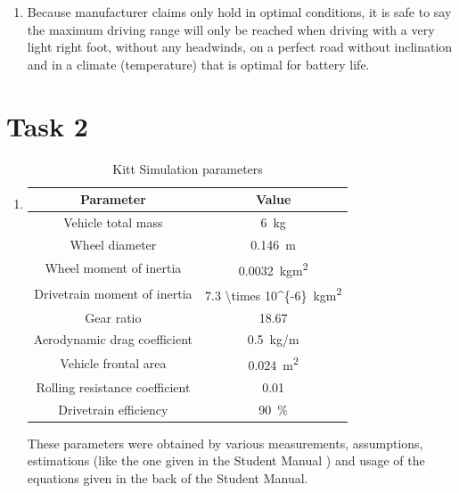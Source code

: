 \documentclass[11pt,titlepage]{report}
\begin{document}
\begin{enumerate}
\item
	Because manufacturer claims only hold in optimal conditions, it is safe to say the maximum driving range will only be reached when driving with a very light right foot, without any headwinds, on a perfect road without inclination and in a climate (temperature) that is optimal for battery life.
\end{enumerate}

\section{Task 2}
\begin{enumerate}
\item
	\begin{table}[H]
		\centering
		\caption{Kitt Simulation parameters}
		\label{tab:ass4-sim-param}
		\begin{tabular}{c c}
			\hline\hline
			Parameter & Value \\
			\hline
			Vehicle total mass & \SI{6}{kg} \\
			Wheel diameter & \SI{0.146}{m} \cite{traxxas-datasheet}\\
			Wheel moment of inertia & \SI{0.0032}{kgm^2} \\
			Drivetrain moment of inertia & \SI{7.3 \times 10^{-6}}{kgm^2} \\
			Gear ratio & \num{18.67} \cite{traxxas-datasheet}\\
			Aerodynamic drag coefficient & \SI{0.5}{kg/m} \\
			Vehicle frontal area & \SI{0.024}{m^2} \\
			Rolling resistance coefficient & \num{0.01} \cite{wikipedia-rolling-resistance}\\
			Drivetrain efficiency & \SI{90}{\percent} \\
			\hline
			\end{tabular}
	\end{table}
	These parameters were obtained by various measurements, assumptions, estimations (like the one given in the Student Manual \cite[32]{epo4-manual}) and usage of the equations given in the back of the Student Manual. \cite[119-131]{epo4-manual}


\end{enumerate}
\end{document}
